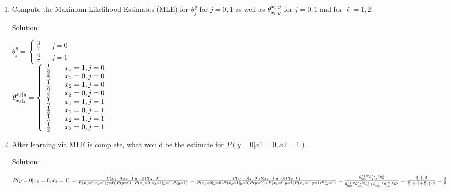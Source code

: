 \documentclass[12pt]{article}
\newcommand{\solu}{{\color{blue} Solution:}}
\newcommand{\overbar}[1]{\mkern 1.5mu\overline{\mkern-1.5mu#1\mkern-1.5mu}\mkern 1.5mu}
\begin{document}
\begin{enumerate}
        \begin{enumerate}
            \item Compute the Maximum Likelihood Estimates (MLE) for $\theta^y_j$ for $j = 0, 1$ as well as $\theta^{{x_l}|y}_{{\overbar{x}_l}|y}$ for $j = 0,1$ and for $\ell=1,2$.
            
            \solu 
        
            $\theta^y_j = \left\{
                \begin{array}{rcl}
                    \frac{3}{7} & & j = 0\\
                    \frac{4}{7} & & j = 1
                \end{array}
            \right.$\\
            $\theta^{x_\ell | y}_{\overbar{x}_\ell | j} = \left\{
                \begin{array}{rcl}
                    \frac{1}{3} & & x_1 = 1, j = 0\\
                    \frac{2}{3} & & x_1 = 0, j = 0\\
                    \frac{1}{3} & & x_2 = 1, j = 0\\
                    \frac{2}{3} & & x_2 = 0, j = 0\\
                    \frac{1}{2} & & x_1 = 1, j = 1\\
                    \frac{1}{2} & & x_1 = 0, j = 1\\
                    \frac{1}{2} & & x_2 = 1, j = 1\\
                    \frac{1}{2} & & x_2 = 0, j = 1
                \end{array}
            \right.$

            \item After learning via MLE is complete, what would be the estimate for $P (y = 0|x1 = 0, x2 = 1)$.
            
            \solu 
            
            $P(y = 0 | x_1 = 0, x_2 = 1)\\
            = \frac{P(x_1 = 0, x_2 = 1 | y = 0)P(y = 0)}{P(x_1 = 0, x_2 = 1 | y= 0)P(y = 0) + P(x_1 = 0, x_2 = 1 |y = 1)P(y = 1)}\\
            = \frac{P(x_1 = 0| y = 0)P(x_2 = 1| y = 0)P(y = 0)}{P(x_1 = 0| y= 0)P(x_2 = 1| y= 0)P(y = 0) + P(x_1 = 0| y= 1)P(x_2 = 1| y= 1)P(y = 1)}\\
            = \frac{\theta^{x_1 | y}_{0 | 0}\theta^{x_2 | y}_{1 | 0}\theta^y_0}{\theta^{x_1 | y}_{0 | 0}\theta^{x_2 | y}_{1 | 0}\theta^y_0 + \theta^{x_1 | y}_{0 | 1}\theta^{x_2 | y}_{1 | 1}\theta^y_1}\\
            = \frac{\frac{2}{3} \cdot \frac{1}{3} \cdot \frac{3}{7}}{\frac{2}{3} \cdot \frac{1}{3} \cdot \frac{3}{7} + \frac{2}{4} \cdot \frac{2}{4} \cdot \frac{4}{7}}\\
            = \frac{2}{5}$


\end{enumerate}
\end{enumerate}
\end{document}
